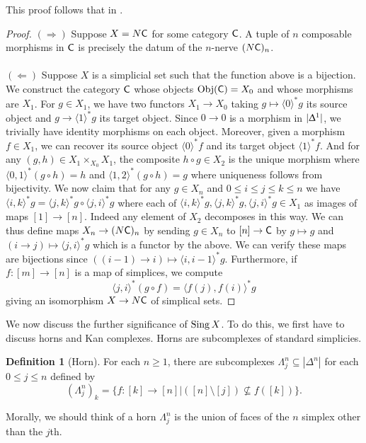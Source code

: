 \documentclass{amsart}
\theoremstyle{definition}
\newtheorem{definition}[theorem]{Definition}
\numberwithin{equation}{section}
\begin{document}
This proof follows that in \cite[Proposition 4.8]{Rezk}.
\begin{proof}
  $(\Longrightarrow)$ Suppose $X=N\mathsf{C}$ for some category $\mathsf{C}$. A tuple of $n$ composable morphisms in $\mathsf{C}$ is precisely the datum of the $n$-nerve $(N\mathsf{C})_{n}$. 
  \\\\
  $(\Longleftarrow)$ Suppose $X$ is a simplicial set such that the function above is a bijection. We construct the category $\mathsf{C}$ whose objects $\mathrm{Obj}(\mathsf{C})=X_{0}$ and whose morphisms are $X_{1}$. For $g\in X_{1}$, we have two functors $X_{1}\to X_{0}$ taking $g\mapsto\langle0\rangle^{*}g$ its source object and $g\to\langle1\rangle^{*}g$ its target object. Since $0\to0$ is a morphism in $|\Updelta^{1}|$, we trivially have identity morphisms on each object. Moreover, given a morphism $f\in X_{1}$, we can recover its source object $\langle0\rangle^{*}f$ and its target object $\langle1\rangle^{*}f$. And for any $(g,h)\in X_{1}\times_{X_{0}}X_{1}$, the composite $h\circ g\in X_{2}$ is the unique morphism where $\langle0,1\rangle^{*}(g\circ h)=h$ and $\langle 1,2\rangle^{*}(g\circ h)=g$ where uniqueness follows from bijectivity. We now claim that for any $g\in X_{n}$ and $0\leq i\leq j\leq k\leq n$ we have $\langle i,k\rangle^{*}g=\langle j,k\rangle^{*}g\circ\langle j,i\rangle^{*}g$ where each of $\langle i,k\rangle^{*}g,\langle j,k\rangle^{*}g,\langle j,i\rangle^{*}g\in X_{1}$ as images of maps $[1]\to[n]$. Indeed any element of $X_{2}$ decomposes in this way. We can thus define maps $X_{n}\to (N\mathsf{C})_{n}$ by sending $g\in X_{n}$ to $[n]\to\mathsf{C}$ by $g\mapsto g$ and $(i\to j)\mapsto \langle j, i\rangle^{*}g$ which is a functor by the above. We can verify these maps are bijections since $((i-1)\to i)\mapsto\langle i, i-1\rangle^{*}g$. Furthermore, if $f:[m]\to [n]$ is a map of simplices, we compute
  $$\langle j,i\rangle^{*}(g\circ f) = \langle f(j), f(i)\rangle^{*}g$$
  giving an isomorphism $X\to N\mathsf{C}$ of simplical sets. 
\end{proof}
We now discuss the further significance of $\operatorname{Sing} X$. To do this, we first have to discuss horns and Kan complexes. Horns are subcomplexes of standard simplicies. 
\begin{definition}[Horn]
  For each $n\geq1$, there are subcomplexes $\Lambda_{j}^{n}\subseteq|\Delta^{n}|$ for each $0\leq j\leq n$ defined by 
  $$(\Lambda_{j}^{n})_{k}=\{f:[k]\to[n]|([n]\setminus[j])\not\subseteq f([k])\}.$$
\end{definition}
Morally, we should think of a horn $\Lambda^{n}_{j}$ is the union of faces of the $n$ simplex other than the $j$th. 
\end{document}
